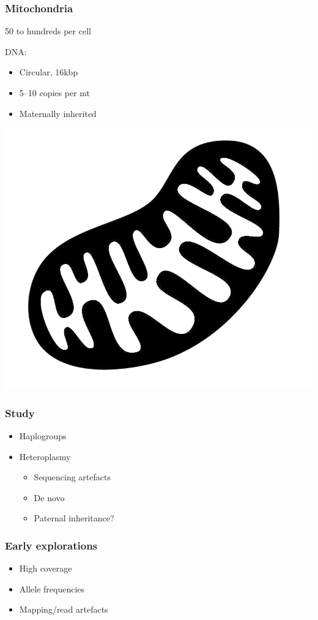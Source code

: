 \documentclass[slidestop,14pt]{beamer}
\begin{document}
\begin{frame}
  \frametitle{Mitochondria}

  \vspace{\baselineskip}

  50 to hundreds per cell

  \vspace{0.5\baselineskip}

  DNA:
  \begin{itemize}
    \item Circular, 16kbp
    \item 5--10 copies per mt
    \item Maternally inherited
  \end{itemize}

  \vspace{-\baselineskip}

  \hspace{0.6\linewidth}\includegraphics[width=0.3\linewidth,transparent]{mitochondrion.png}
\end{frame}

\begin{frame}
  \frametitle{Study}

  \vspace{\baselineskip}

  \begin{itemize}
    \item Haplogroups
    \item Heteroplasmy
      \begin{itemize}
        \item Sequencing artefacts
        \item De novo
        \item Paternal inheritance?
      \end{itemize}
  \end{itemize}

\end{frame}

\begin{frame}
  \frametitle{Early explorations}

  \vspace{\baselineskip}

  \begin{itemize}
    \item High coverage
    \item Allele frequencies
    \item Mapping/read artefacts
  \end{itemize}
\end{frame}
\end{document}

